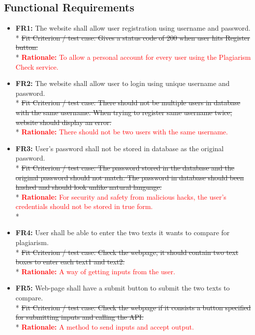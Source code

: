 \documentclass[12pt, titlepage]{article}
\begin{document}
\subsection{Functional Requirements}
\begin{itemize}
  \item \textbf{FR1:} The website shall allow user registration using username and password. \\*
  \st{Fit Criterion / test case: Gives a status code of 200 when user hits Register button.} \\*
  \textcolor{red}{\textbf{Rationale:} To allow a personal account for every user using the Plagiarism Check service.} 
  
  \item \textbf{FR2:} The website shall allow user to login using unique username and password. \\*
  \st{Fit Criterion / test case: There should not be multiple users in database with the same username. When trying to register same username twice, website should display an error. } \\*
  \textcolor{red}{\textbf{Rationale:} There should not be two users with the same username.}
  
  \item \textbf{FR3:} User's password shall not be stored in database as the original password. \\*
  \st{Fit Criterion / test case: The password stored in the database and the original password should not match. The password in database should been hashed and should look unlike natural language.} \\*
  \textcolor{red}{\textbf{Rationale:} For security and safety from malicious hacks, the user's credentials should not be stored in true form.} \\*
  
  \item \textbf{FR4:} User shall be able to enter the two texts it wants to compare for plagiarism. \\*
  \st{Fit Criterion / test case: Check the webpage, it should contain two text boxes to enter each text1 and text2.} \\*
  \textcolor{red}{\textbf{Rationale:} A way of getting inputs from the user.}
  
  \item \textbf{FR5:} Web-page shall have a submit button to submit the two texts to compare. \\*
  \st{Fit Criterion / test case: Check the webpage if it consists a button specified for submitting inputs and calling the API.} \\*
  \textcolor{red}{\textbf{Rationale:} A method to send inputs and accept output.}
  

\end{itemize}
\end{document}
